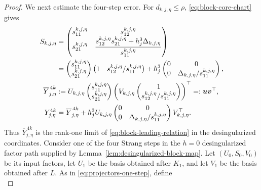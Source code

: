 \documentclass[]{article}
\numberwithin{equation}{section}
\theoremstyle{plain}
\theoremstyle{remark}
\begin{document}
\begin{proof}
We next estimate the four-step error.  For
\(d_{k,j,\eta}\le\rho\), \eqref{eq:block-core-chart} gives
\begin{align}
 S_{k,j,\eta}
 &=\begin{pmatrix}
 s_{11}^{k,j,\eta}&s_{12}^{k,j,\eta}\\
 s_{21}^{k,j,\eta}&
 \dfrac{s_{12}^{k,j,\eta}s_{21}^{k,j,\eta}
       +h_j^3\Delta_{k,j,\eta}}{s_{11}^{k,j,\eta}}
 \end{pmatrix}\notag\\
 &=\begin{pmatrix}s_{11}^{k,j,\eta}\\s_{21}^{k,j,\eta}\end{pmatrix}
   \begin{pmatrix}1&s_{12}^{k,j,\eta}/s_{11}^{k,j,\eta}\end{pmatrix}
 +h_j^3\begin{pmatrix}
 0&0\\0&\Delta_{k,j,\eta}/s_{11}^{k,j,\eta}
 \end{pmatrix},
 \label{eq:block-core-positive-step-expansion}\\
 \overline Y_{j,\eta}^{\,4k}
 &:=U_{k,j,\eta}
 \begin{pmatrix}s_{11}^{k,j,\eta}\\s_{21}^{k,j,\eta}\end{pmatrix}
 \left(
 V_{k,j,\eta}
 \begin{pmatrix}1\\s_{12}^{k,j,\eta}/s_{11}^{k,j,\eta}\end{pmatrix}
 \right)^\top
 =:\boldsymbol u\boldsymbol v^\top,
 \label{eq:block-leading-matrix}\\
 Y_{j,\eta}^{4k}
 &=\overline Y_{j,\eta}^{\,4k}
 +h_j^3U_{k,j,\eta}
 \begin{pmatrix}
 0&0\\0&\Delta_{k,j,\eta}/s_{11}^{k,j,\eta}
 \end{pmatrix}
 V_{k,j,\eta}^\top.
 \label{eq:block-leading-relation}
\end{align}
Thus \(\overline Y_{j,\eta}^{\,4k}\) is the rank-one limit of
\eqref{eq:block-leading-relation} in the desingularized coordinates.
Consider one of
the four Strang steps in the $h=0$ desingularized factor path supplied by
Lemma~\ref{lem:desingularized-block-map}.  Let
$(U_0,S_0,V_0)$ be its input factors, let $U_1$ be the basis obtained
after $K_1$, and let $V_1$ be the basis obtained after $L$.  As in
\eqref{eq:projectors-one-step}, define
\begin{equation}\label{eq:block-proof-projectors}

\end{equation}
\end{proof}
\end{document}
